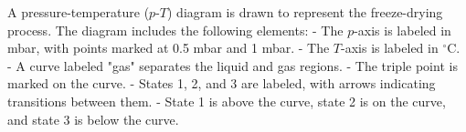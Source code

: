 A pressure-temperature (\( p \)-\( T \)) diagram is drawn to represent the freeze-drying process. The diagram includes the following elements:  
- The \( p \)-axis is labeled in mbar, with points marked at 0.5 mbar and 1 mbar.  
- The \( T \)-axis is labeled in \( ^\circ \text{C} \).  
- A curve labeled "gas" separates the liquid and gas regions.  
- The triple point is marked on the curve.  
- States 1, 2, and 3 are labeled, with arrows indicating transitions between them.  
- State 1 is above the curve, state 2 is on the curve, and state 3 is below the curve.